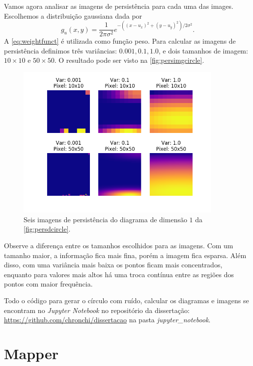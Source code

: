 Vamos agora analisar as imagens de persistência para cada uma das images. Escolhemos a distribuição gaussiana
dada por 
\begin{equation*}
    g_u(x,y) = \frac{1}{2\pi\sigma^2}e^{-((x-u_x)^2 + (y-u_y)^2)/2\sigma^2}.
\end{equation*}
A \autoref{eq:weightfunct} é utilizada como função peso. Para calcular as imagens de persistência 
definimos três variâncias: $0.001, 0.1, 1.0$, e dois tamanhos de imagem: 
$10\times10$ e $50\times50$. O resultado pode ser visto na \autoref{fig:persimgcircle}.
\begin{figure}[!htbp]
    \centering
    \includegraphics[width=0.9\textwidth]{images/comparacao_pis.png}
    \caption{Seis imagens de persistência do diagrama de dimensão $1$ da \autoref{fig:persdcircle}.} 
    \label{fig:persimgcircle}
    \fautor
\end{figure}

Observe a diferença entre os tamanhos escolhidos para as imagens. Com um tamanho maior, a informação fica mais fina,
porém a imagem fica esparsa. Além disso, com uma variância mais baixa os pontos ficam mais concentrados, enquanto
para valores mais altos há uma troca contínua entre as regiões dos pontos com maior frequência.

Todo o código para gerar o círculo com ruído, calcular os diagramas e imagens se encontram no 
\textit{Jupyter Notebook} no repositório da dissertação: \url{https://github.com/chronchi/dissertacao} na pasta
\textit{jupyter\_notebook}.

\section{Mapper}

